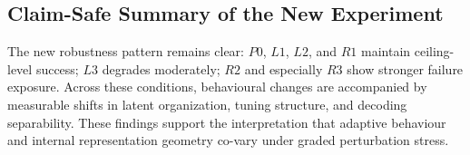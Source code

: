 \subsection{Claim-Safe Summary of the New Experiment}

The new robustness pattern remains clear: $P0$, $L1$, $L2$, and $R1$ maintain ceiling-level success; $L3$ degrades moderately; $R2$ and especially $R3$ show stronger failure exposure.
Across these conditions, behavioural changes are accompanied by measurable shifts in latent organization, tuning structure, and decoding separability.
These findings support the interpretation that adaptive behaviour and internal representation geometry co-vary under graded perturbation stress.